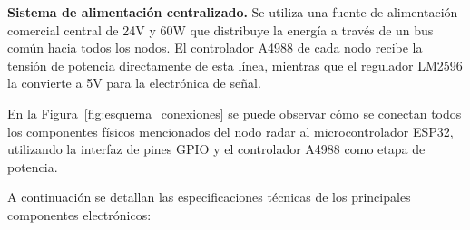 \textbf{Sistema de alimentación centralizado.} Se utiliza una fuente de alimentación comercial central de 24V y 60W que distribuye la energía a través de un bus común hacia todos los nodos. El controlador A4988 de cada nodo recibe la tensión de potencia directamente de esta línea, mientras que el regulador LM2596 la convierte a 5V para la electrónica de señal.

En la Figura~\ref{fig:esquema_conexiones} se puede observar cómo se conectan todos los componentes físicos mencionados del nodo radar al microcontrolador ESP32, utilizando la interfaz de pines GPIO y el controlador A4988 como etapa de potencia.


A continuación se detallan las especificaciones técnicas de los principales componentes electrónicos:

